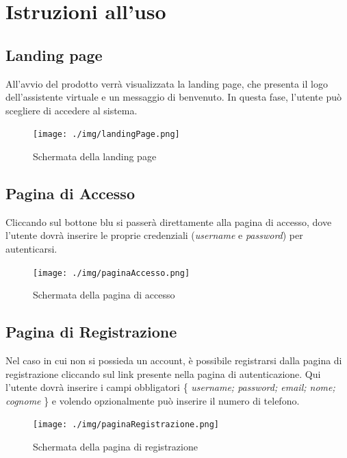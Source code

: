 \section{Istruzioni all'uso}

\subsection{Landing page}
All'avvio del prodotto verrà visualizzata la landing page, che presenta il logo dell'assistente virtuale e un messaggio di benvenuto. In questa fase, l'utente può scegliere di accedere al sistema.
\begin{figure}[h!]
    \centering
    \texttt{[image: ./img/landingPage.png]}
    \caption{Schermata della landing page}
\end{figure}

\subsection{Pagina di Accesso}
Cliccando sul bottone blu si passerà direttamente alla pagina di accesso, dove l'utente dovrà inserire le proprie credenziali (\textit{username} e \textit{password}) per autenticarsi.
\begin{figure}[h!]
    \centering
    \texttt{[image: ./img/paginaAccesso.png]}
    \caption{Schermata della pagina di accesso}
\end{figure}

\subsection{Pagina di Registrazione}
Nel caso in cui non si possieda un account, è possibile registrarsi dalla pagina di registrazione cliccando sul link presente nella pagina di autenticazione.
Qui l'utente dovrà inserire i campi obbligatori \{ \textit{username; password; email; nome; cognome} \} e volendo opzionalmente può inserire il numero di telefono.
\begin{figure}[h!]
    \centering
    \texttt{[image: ./img/paginaRegistrazione.png]}
    \caption{Schermata della pagina di registrazione}
\end{figure}

